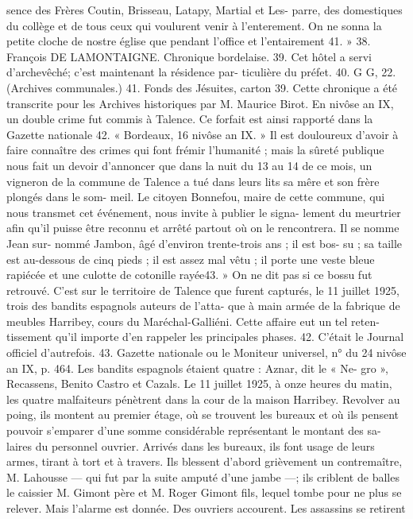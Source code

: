 \documentclass[a4paper,11pt]{book}
\begin{document}
sence des Frères Coutin, Brisseau, Latapy, Martial et Les-
parre, des domestiques du collège et de tous ceux qui
voulurent venir à l'enterement. On ne sonna la petite cloche
de nostre église que pendant l'office et l'entairement 41. »
38. François DE LAMONTAIGNE. Chronique bordelaise.
39. Cet hôtel a servi d'archevêché; c'est maintenant la résidence par-
ticulière du préfet.
40. G G, 22. (Archives communales.)
41. Fonds des Jésuites, carton 39. Cette chronique a été transcrite
pour les Archives historiques par M. Maurice Birot.
En nivôse an IX, un double crime fut commis à Talence.
Ce forfait est ainsi rapporté dans la Gazette nationale 42.
« Bordeaux, 16 nivôse an IX.
» Il est douloureux d'avoir à faire connaître des crimes
qui font frémir l'humanité ; mais la sûreté publique nous
fait un devoir d'annoncer que dans la nuit du 13 au 14
de ce mois, un vigneron de la commune de Talence a tué
dans leurs lits sa mêre et son frère plongés dans le som-
meil. Le citoyen Bonnefou, maire de cette commune, qui
nous transmet cet événement, nous invite à publier le signa-
lement du meurtrier afin qu'il puisse être reconnu et
arrêté partout où on le rencontrera. Il se nomme Jean sur-
nommé Jambon, âgé d'environ trente-trois ans ; il est bos-
su ; sa taille est au-dessous de cinq pieds ; il est assez mal
vêtu ; il porte une veste bleue rapiécée et une culotte de
cotonille rayée43. »
On ne dit pas si ce bossu fut retrouvé.
C'est sur le territoire de Talence que furent capturés, le
11 juillet 1925, trois des bandits espagnols auteurs de l'atta-
que à main armée de la fabrique de meubles Harribey,
cours du Maréchal-Galliéni. Cette affaire eut un tel reten-
tissement qu'il importe d'en rappeler les principales phases.
42. C'était le Journal officiel d'autrefois.
43. Gazette nationale ou le Moniteur universel, n° du 24 nivôse an IX,
p. 464.
Les bandits espagnols étaient quatre : Aznar, dit le « Ne-
gro », Recassens, Benito Castro et Cazals.
Le 11 juillet 1925, à onze heures du matin, les quatre
malfaiteurs pénètrent dans la cour de la maison Harribey.
Revolver au poing, ils montent au premier étage, où se
trouvent les bureaux et où ils pensent pouvoir s'emparer
d'une somme considérable représentant le montant des sa-
laires du personnel ouvrier. Arrivés dans les bureaux, ils
font usage de leurs armes, tirant à tort et à travers. Ils
blessent d'abord grièvement un contremaître, M. Lahousse
— qui fut par la suite amputé d'une jambe —; ils criblent
de balles le caissier M. Gimont père et M. Roger Gimont
fils, lequel tombe pour ne plus se relever. Mais l'alarme est
donnée. Des ouvriers accourent. Les assassins se retirent
\end{document}
